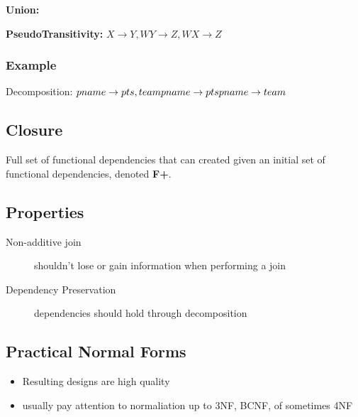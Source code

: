 \documentclass[12pt]{article}
\begin{document}
\textbf{Union:}

\textbf{PseudoTransitivity:}
\begin{math}
  X \rightarrow Y, WY \rightarrow Z, WX \rightarrow Z
\end{math}
\subsubsection{Example}
Decomposition:
\begin{math}
  pname \rightarrow pts, team\\
  pname \rightarrow pts\\
  pname \rightarrow team
\end{math}

\subsection{Closure}
Full set of functional dependencies that can  created given an initial set of
functional dependencies, denoted \textbf{F+}.

\subsection{Properties}
\begin{description}
  \item[Non-additive join] shouldn't lose or gain information when performing a
    join
  \item[Dependency Preservation] dependencies should hold through decomposition
\end{description}
\subsection{Practical Normal Forms}
\begin{itemize}
  \item {Resulting designs are high quality}
  \item {usually pay attention to normaliation up to 3NF, BCNF, of sometimes 4NF}
\end{itemize}
\end{document}
